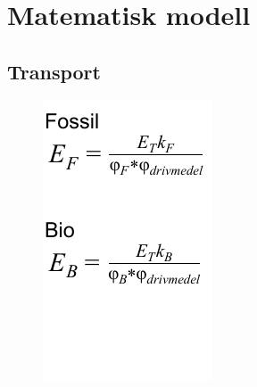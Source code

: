 \documentclass[a4paper,11pt,fleqn]{article}
\begin{document}
\section {Matematisk modell}
\subsection{Transport}
\begin{figure}[h!]
	\centering 
 		\includegraphics[scale = 0.75]{transport2.pdf}
		\label{diagram}
\end{figure}
\end{document}

